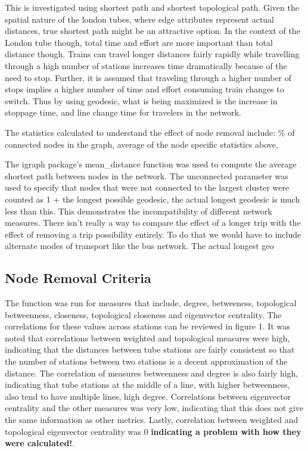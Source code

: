 \documentclass[11pt]{article} %
\begin{document}
This is investigated using shortest path and shortest topological path. Given the spatial nature of the london tubes, where edge attributes represent actual distances, true shortest path might be an attractive option. In the context of the London tube though, total time and effort are more important than total distance though. Trains can travel longer distances fairly rapidly while travelling through a high number of stations increases time dramatically because of the need to stop. Further, it is assumed that traveling through a higher number of stops implies a higher number of time and effort consuming train changes to switch. Thus by using geodesic, what is being maximized is the increase in stoppage time, and line change time for travelers in the network.

The statistics calculated to understand the effect of node removal include: \% of connected nodes in the graph, average of the node specific statistics above, 

The igraph package's mean\_distance\(\) function was used to compute the average shortest path between nodes in the network. The unconnected parameter was used to specify that nodes that were not connected to the largest cluster were counted as 1 + the longest possible geodesic, the actual longest geodesic is much less than this. This demonstrates the incompatibility of different network measures. There isn't really a way to compare the effect of a longer trip with the effect of removing a trip possibility entirely. To do that we would have to include alternate modes of transport like the bus network.  The actual longest geo

\subsection{Node Removal Criteria}

The function was run for measures that include, degree, betweeness, topological betweenness, closeness, topological closeness and eigenvector centrality. The correlations for these values across stations can be reviewed in figure 1. It was noted that correlations between weighted and topological measures were high, indicating that the distances between tube stations are fairly consistent so that the number of stations between two stations is a decent approximation of the distance. The correlation of measures betweenness and degree is also fairly high, indicating that tube stations at the middle of a line, with higher betweenness, also tend to have multiple lines, high degree. Correlations between eigenvector centrality and the other measures was very low, indicating that this does not give the same information as other metrics. Lastly, correlation between weighted and topological eigenvector centrality was 0 \textbf{indicating a problem with how they were calculated!}. 
\end{document}
